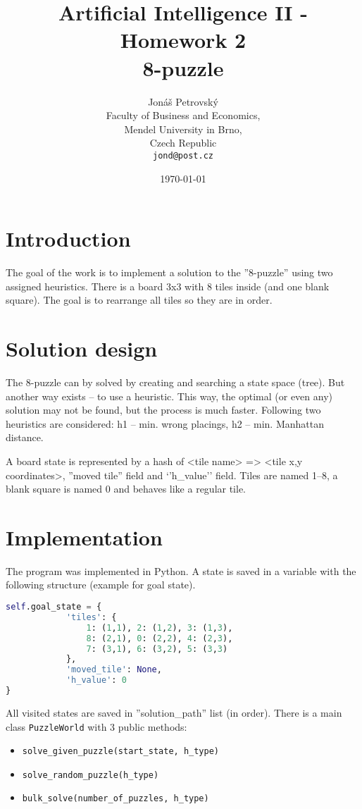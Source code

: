 \documentclass{article}
\begin{document}
\title{Artificial Intelligence II - Homework 2 \\ 8-puzzle}
\author{Jonáš Petrovský\\
        Faculty of Business and Economics,\\
		Mendel University in Brno,\\
		Czech Republic \\
		\texttt{jond@post.cz}}
\date{\today}
\maketitle

\section{Introduction}
The goal of the work is to implement a solution to the ''8-puzzle'' using two assigned heuristics. There is a board 3x3 with 8 tiles inside (and one blank square). The goal is to rearrange all tiles so they are in order. 

\section{Solution design}
The 8-puzzle can by solved by creating and searching a state space (tree). But another way exists -- to use a heuristic. This way, the optimal (or even any) solution may not be found, but the process is much faster. Following two heuristics are considered: h1 -- min. wrong placings, h2 -- min. Manhattan distance.

A board state is represented by a hash of <tile name> => <tile x,y coordinates>, ''moved tile'' field and `'h\_value'' field. Tiles are named 1--8, a blank square is named 0 and behaves like a regular tile. 


\section{Implementation}
The program was implemented in Python. A state is saved in a variable with the following structure (example for goal state).
\begin{lstlisting}[language=python]
self.goal_state = {
            'tiles': {
                1: (1,1), 2: (1,2), 3: (1,3),
                8: (2,1), 0: (2,2), 4: (2,3),
                7: (3,1), 6: (3,2), 5: (3,3)
            },
            'moved_tile': None,
            'h_value': 0
}
\end{lstlisting}
All visited states are saved in ''solution\_path'' list (in order). There is a main class \texttt{PuzzleWorld} with 3 public methods: 
\begin{itemize}
\item \verb|solve_given_puzzle(start_state, h_type)|
\item \verb|solve_random_puzzle(h_type)|
\item \verb|bulk_solve(number_of_puzzles, h_type)|
\end{itemize}
\end{document}
